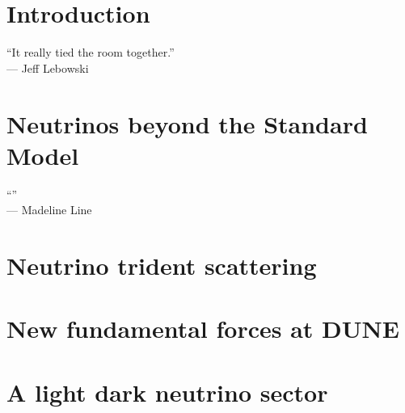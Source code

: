 \documentclass[openany,twoside,frontopenright,chaprunninghead]{ip3thesis}
\begin{document}


\cleardoublepage

\begin{epigraph*}
% 
% 
\end{epigraph*} 



\chapter{Introduction}
\begin{flushright}
	``It really tied the room together.''
	\\--- Jeff Lebowski
\end{flushright}


\chapter{Neutrinos beyond the Standard Model}
\begin{flushright}
	``''
	\\--- Madeline Line
\end{flushright}


\chapter{Neutrino trident scattering}


\chapter{New fundamental forces at DUNE}


\chapter{A light dark neutrino sector}

\end{document}
